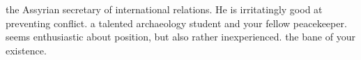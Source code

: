 \documentclass[char]{Kos}
\begin{document}
\begin{contacts}
 the Assyrian secretary of international relations. He is irritatingly good at preventing conflict.
\contact{\cArchaeologist{}} a talented archaeology student and your fellow peacekeeper.  seems enthusiastic about \cArchaeologist{\their} position, but also rather inexperienced.
\contact{\cMerchant{}} the bane of your existence.
\end{contacts}
\end{document}
